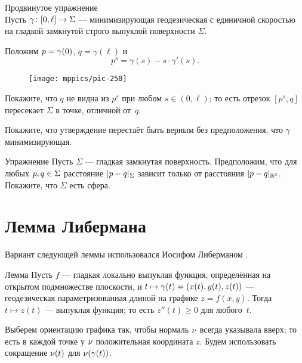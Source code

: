 {

\begin{thm}{Продвинутое упражнение}\label{ex:milka}\\
Пусть $\gamma\:[0,\ell]\z\to \Sigma$ --- минимизирующая геодезическая с единичной скоростью на 
гладкой замкнутой строго выпуклой поверхности $\Sigma$.

Положим $p\z=\gamma(0)$, $q=\gamma(\ell)$ и 
\[p^s=\gamma(s)-s\cdot\gamma'(s).\]

\begin{wrapfigure}{r}{40 mm}
\vskip-0mm
\centering
\texttt{[image: mppics/pic-250]}
\vskip-0mm
\end{wrapfigure}

Покажите, что $q$ не видна из $p^s$ при любом $s\in (0,\ell)$;
то есть отрезок $[p^s,q]$ пересекает $\Sigma$ в точке, отличной от~$q$.

Покажите, что утверждение перестаёт быть верным без предположения, что $\gamma$ минимизирующая.
\end{thm}

}

\begin{wrapfigure}[3]{r}{40 mm}
\end{wrapfigure}

\begin{thm}{Упражнение}\label{ex:round-sphere}
Пусть $\Sigma$ --- гладкая замкнутая поверхность.
Предположим, что для любых $p,q\z\in \Sigma$ расстояние $\dist{p}{q}\Sigma$ зависит только от расстояния $\dist{p}{q}{\mathbb{R}^3}$.
Покажите, что $\Sigma$ есть сфера.
\end{thm}



\section{Лемма Либермана}

Вариант следующей леммы использовался Иосифом Либерманом \cite{liberman}.

\begin{thm}{Лемма}
\label{lem:liberman}
Пусть $f$ --- гладкая локально выпуклая функция, определённая на открытом подмножестве плоскости,
и $t\mapsto \gamma(t)\z=(x(t),y(t),z(t))$ --- геодезическая параметризованная длиной на графике $z=f(x,y)$.
Тогда $t\mapsto z(t)$ --- выпуклая функция; то есть $z''(t)\ge 0$ для любого~$t$.
\end{thm}

Выберем ориентацию графика так, чтобы нормаль $\nu$ всегда указывала вверх;
то есть в каждой точке у $\nu$ положительная координата $z$.
Будем использовать сокращение $\nu(t)$ для $\nu(\gamma(t))$.

